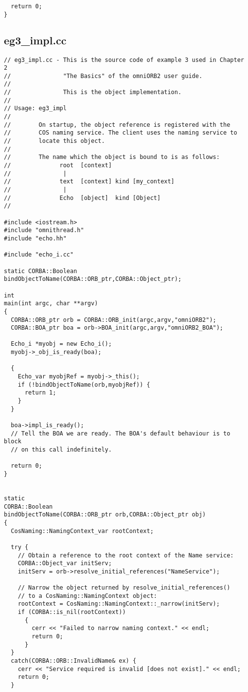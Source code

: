 \documentclass[11pt,twoside,onecolumn]{book}
\begin{document}
{\begin{verbatim}
  return 0;
}
\end{verbatim}
\newpage

\subsection{eg3\_impl.cc}
\begin{verbatim}
// eg3_impl.cc - This is the source code of example 3 used in Chapter 2
//               "The Basics" of the omniORB2 user guide.
//
//               This is the object implementation.
//
// Usage: eg3_impl
//
//        On startup, the object reference is registered with the 
//        COS naming service. The client uses the naming service to
//        locate this object.
//
//        The name which the object is bound to is as follows:
//              root  [context]
//               |
//              text  [context] kind [my_context]
//               |
//              Echo  [object]  kind [Object]
//

#include <iostream.h>
#include "omnithread.h"
#include "echo.hh"

#include "echo_i.cc"

static CORBA::Boolean bindObjectToName(CORBA::ORB_ptr,CORBA::Object_ptr);

int
main(int argc, char **argv)
{
  CORBA::ORB_ptr orb = CORBA::ORB_init(argc,argv,"omniORB2");
  CORBA::BOA_ptr boa = orb->BOA_init(argc,argv,"omniORB2_BOA");

  Echo_i *myobj = new Echo_i();
  myobj->_obj_is_ready(boa);

  {
    Echo_var myobjRef = myobj->_this();
    if (!bindObjectToName(orb,myobjRef)) {
      return 1;
    }
  }

  boa->impl_is_ready();
  // Tell the BOA we are ready. The BOA's default behaviour is to block
  // on this call indefinitely.

  return 0;
}


static
CORBA::Boolean
bindObjectToName(CORBA::ORB_ptr orb,CORBA::Object_ptr obj)
{
  CosNaming::NamingContext_var rootContext;
  
  try {
    // Obtain a reference to the root context of the Name service:
    CORBA::Object_var initServ;
    initServ = orb->resolve_initial_references("NameService");

    // Narrow the object returned by resolve_initial_references()
    // to a CosNaming::NamingContext object:
    rootContext = CosNaming::NamingContext::_narrow(initServ);
    if (CORBA::is_nil(rootContext))
      {
        cerr << "Failed to narrow naming context." << endl;
        return 0;
      }
  }
  catch(CORBA::ORB::InvalidName& ex) {
    cerr << "Service required is invalid [does not exist]." << endl;
    return 0;
  }



\end{verbatim}}
\end{document}
